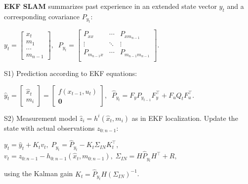 \documentclass[landscape]{article}
\newcommand{\vmspace}{\vspace{-7pt}}
\newcommand{\vpspace}{\vspace{5pt}}
\begin{document}
\begin{multicols}{3}
\begin{minipage}{\columnwidth}
  \textbf{EKF SLAM} summarizes past experience in an extended state vector $y_t$
  and a corresponding covariance $P_{y_t}$:
  \vmspace
  \begin{center}
    $
    y_t
    =
    \left[
    \begin{matrix}
      x_t \\
      m_1 \\
      \cdots \\
      m_{n-1}
    \end{matrix}
    \right],\;\;
    P_{y_t}
    =
    \left[
    \begin{matrix}
      P_{xx} & \cdots & P_{xm_{n-1}} \\
      \vdots & \ddots & \vdots \\
      P_{m_{n-1}x} & \cdots & P_{m_{n-1}m_{n-1}} \\
    \end{matrix}
    \right]
    $.
  \end{center}
  \vmspace
  S1) Prediction according to EKF equations:
  \vmspace
  \begin{center}
    $
    \hat y_t
    =
    \left[
    \begin{matrix}
      \hat x_t \\
      m_i
    \end{matrix}
    \right]
    =
    \left[
    \begin{matrix}
      f(x_{t-1}, u_t) \\
      \mathbf 0
    \end{matrix}
    \right],\;\;
    \hat P_{y_t}
    =
    F_yP_{y_{t-1}}F_y^\intercal + F_uQ_tF_u^\intercal.
    $
  \end{center}
  \vmspace
  S2) Measurement model $\hat z_i=h^i(\hat x_t, m_i)$ as in EKF localization.
  Update the state with actual observations $z_{0:n-1}$:
  \vmspace
  \begin{center}
    $
    y_t
    =
    \hat y_t + K_t v_t,\;
    P_{y_t} = \hat P_{y_t} - K_t\Sigma_{IN}K_t^\intercal$,\\
    $
    v_t=z_{0:n-1} - h_{0:n-1}(\hat x_t, m_{0:n-1}),\;
    \Sigma_{IN} = H\hat P_{y_t}H^\intercal + R,\;
    $
  \end{center}
  \vmspace
  using the Kalman gain $K_t = \hat P_{y_t}H(\Sigma_{IN})^{-1}$.
\end{minipage}

\vpspace


\end{multicols}
\end{document}
